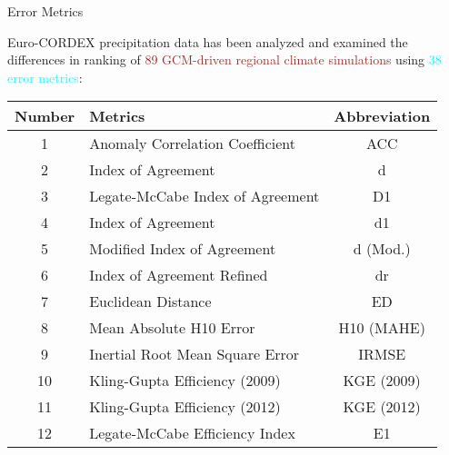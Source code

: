 \documentclass[xcolor={dvipsnames}]{beamer}
\begin{document}
\begin{frame}{Error Metrics}

Euro-CORDEX precipitation data has been analyzed and examined the differences in ranking of \textcolor{brown}{89 GCM-driven regional climate simulations} using \textcolor{cyan}{38 error metrics}: 

\begin{center}
\begin{tabular}{|>{\tiny}c|>{\tiny}l|>{\tiny}c|}
\hline
\textbf{Number} & \textbf{Metrics} & \textbf{Abbreviation} \\
\hline
1 & Anomaly Correlation Coefficient & ACC \\
2 & Index of Agreement & d \\
3 & Legate-McCabe Index of Agreement & D1 \\
4 & Index of Agreement & d1 \\
5 & Modified Index of Agreement & d (Mod.) \\
6 & Index of Agreement Refined & dr \\
7 & Euclidean Distance & ED \\
8 & Mean Absolute H10 Error & H10 (MAHE) \\
9 & Inertial Root Mean Square Error & IRMSE \\
10 & Kling-Gupta Efficiency (2009) & KGE (2009) \\
11 & Kling-Gupta Efficiency (2012) & KGE (2012) \\
12 & Legate-McCabe Efficiency Index & E1 \\
\hline
\end{tabular}
\end{center}
    
\end{frame}
\end{document}
